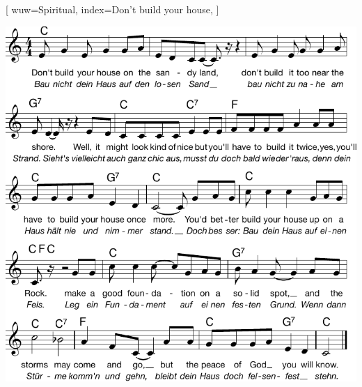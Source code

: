 [
    wuw={Spiritual}, 
    index={Don't build your house},
]


\beginverse
\endverse
\centering\includegraphics[width=1\textwidth]{Noten/Lied116.pdf}

\endsong
